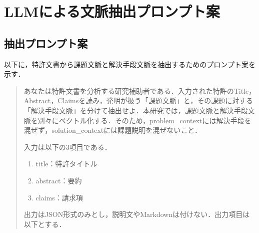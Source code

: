\chapter{LLMによる文脈抽出プロンプト案}

\section{抽出プロンプト案}
以下に，特許文書から課題文脈と解決手段文脈を抽出するためのプロンプト案を示す．

\begin{quote}
あなたは特許文書を分析する研究補助者である．入力された特許のTitle，Abstract，Claimsを読み，発明が扱う「課題文脈」と，その課題に対する「解決手段文脈」を分けて抽出せよ．本研究では，課題文脈と解決手段文脈を別々にベクトル化する．そのため，problem\_contextには解決手段を混ぜず，solution\_contextには課題説明を混ぜないこと．

入力は以下の3項目である．

\begin{enumerate}
  \item title：特許タイトル
  \item abstract：要約
  \item claims：請求項
\end{enumerate}

出力はJSON形式のみとし，説明文やMarkdownは付けない．出力項目は以下とする．


\end{quote}
